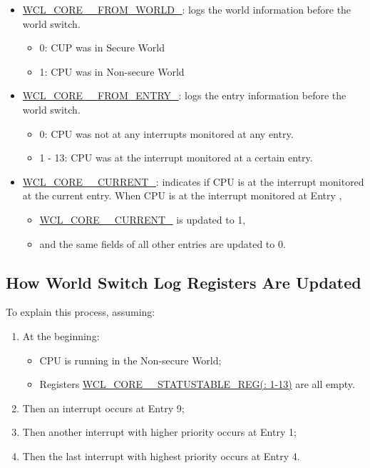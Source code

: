 \documentclass[main\_\_EN.tex]{subfiles}
\begin{document}
\begin{itemize}
    \item \hyperref[fielddesc:WCLCORE0FROMWORLDn]{WCL\_CORE\_\_FROM\_WORLD\_}: logs the world information before the world switch.
    \begin{itemize}
        \item 0: CUP was in Secure World
        \item 1: CPU was in Non-secure World
    \end{itemize}
    \item \hyperref[fielddesc:WCLCORE0FROMENTRYn]{WCL\_CORE\_\_FROM\_ENTRY\_}: logs the entry information before the world switch.
    \begin{itemize}
        \item 0: CPU was not at any interrupts monitored at any entry.
        \item 1 - 13: CPU was at the interrupt monitored at a certain entry.
    \end{itemize}
    \item \hyperref[fielddesc:WCLCORE0CURRENTn]{WCL\_CORE\_\_CURRENT\_}: indicates if CPU is at the interrupt monitored at the current entry. When CPU is at the interrupt monitored at Entry , \begin{itemize}
        \item  \hyperref[fielddesc:WCLCORE0CURRENTn]{WCL\_CORE\_\_CURRENT\_} is updated to 1,
        \item and the same fields of all other entries are updated to 0.
    \end{itemize}
\end{itemize}

\subsection{How World Switch Log Registers Are Updated}\label{sec:wctrl-update-statetable}

To explain this process, assuming:
\begin{enumerate}
    \item At the beginning:
    \begin{itemize}
        \item CPU is running in the Non-secure World;
        \item Registers \hyperref[regdesc:WCLCORE0STATUSTABLEnREG]{WCL\_CORE\_\_STATUSTABLE\_REG(: 1-13)} are all empty.
    \end{itemize}
    \item Then an interrupt occurs at Entry 9;
    \item Then another interrupt with higher priority occurs at Entry 1;
    \item Then the last interrupt with highest priority occurs at Entry 4.
\end{enumerate}
\end{document}
